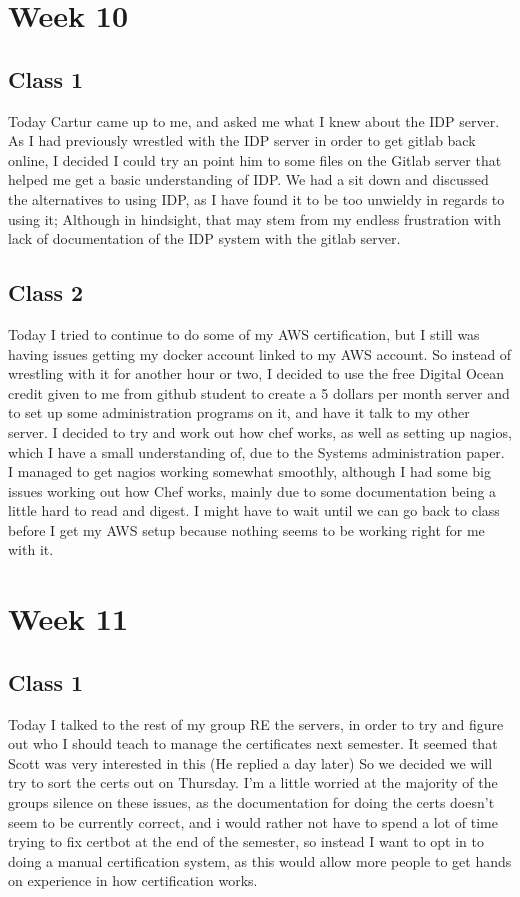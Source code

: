 \documentclass{article}
\begin{document}
\section{Week 10}
\subsection{Class 1}
Today Cartur came up to me, and asked me what I knew about the IDP server. As I had previously wrestled with the IDP server in order to get
gitlab back online, I decided I could try an point him to some files on the Gitlab server that helped me get a basic understanding of IDP. We had 
a sit down and discussed the alternatives to using IDP, as I have found it to be too unwieldy in regards to using it; Although in hindsight, that
may stem from my endless frustration with lack of documentation of the IDP system with the gitlab server.
\subsection{Class 2}
Today I tried to continue to do some of my AWS certification, but I still was having issues getting my docker account linked to my AWS account. So instead
of wrestling with it for another hour or two, I decided to use the free Digital Ocean credit given to me from github student to create a 5 dollars per month server
and to set up some administration programs on it, and have it talk to my other server. I decided to try and work out how chef works, as well as setting up
nagios, which I have a small understanding of, due to the Systems administration paper. I managed to get nagios working somewhat smoothly, although I had some
big issues working out how Chef works, mainly due to some documentation being a little hard to read and digest. I might have to wait until we can go back
to class before I get my AWS setup because nothing seems to be working right for me with it.

\section{Week 11}
\subsection{Class 1}
Today I talked to the rest of my group RE the servers, in order to try and figure out who I should teach to manage the certificates next semester. It seemed that
Scott was very interested in this (He replied a day later) So we decided we will try to sort the certs out on Thursday. I'm a little worried at the majority of 
the groups silence on these issues, as the documentation for doing the certs doesn't seem to be currently correct, and i would rather not have to spend a lot of 
time trying to fix certbot at the end of the semester, so instead I want to opt in to doing a manual certification system, as this would allow more people to get 
hands on experience in how certification works.
\end{document}
